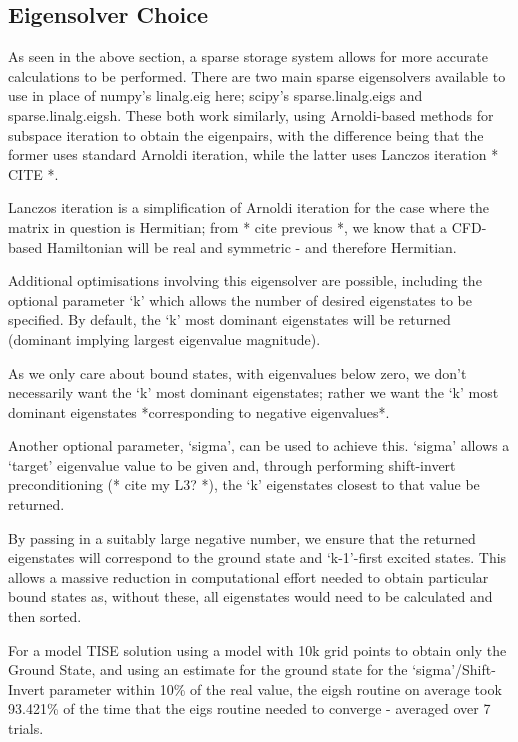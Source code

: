 \subsection{Eigensolver Choice}
As seen in the above section, a sparse storage system allows for more accurate calculations to be performed. There are two main sparse eigensolvers available to use in place of numpy's linalg.eig here; scipy's sparse.linalg.eigs and sparse.linalg.eigsh. These both work similarly, using Arnoldi-based methods for subspace iteration to obtain the eigenpairs, with the difference being that the former uses standard Arnoldi iteration, while the latter uses Lanczos iteration * CITE *. 

Lanczos iteration is a simplification of Arnoldi iteration for the case where the matrix in question is Hermitian; from * cite previous *, we know that a CFD-based Hamiltonian will be real and symmetric - and therefore Hermitian. 

Additional optimisations involving this eigensolver are possible, including the optional parameter `k' which allows the number of desired eigenstates to be specified. By default, the `k' most dominant eigenstates will be returned (dominant implying largest eigenvalue magnitude). 

As we only care about bound states, with eigenvalues below zero, we don't necessarily want the `k' most dominant eigenstates; rather we want the `k' most dominant eigenstates *corresponding to negative eigenvalues*. 

Another optional parameter, `sigma', can be used to achieve this. `sigma' allows a `target' eigenvalue value to be given and, through performing shift-invert preconditioning (* cite my L3? *), the `k' eigenstates closest to that value be returned. 

By passing in a suitably large negative number, we ensure that the returned eigenstates will correspond to the ground state and `k-1'-first excited states. This allows a massive reduction in computational effort needed to obtain particular bound states as, without these, all eigenstates would need to be calculated and then sorted. 

For a model TISE solution using a model with 10k grid points to obtain only the Ground State, and using an estimate for the ground state for the `sigma'/Shift-Invert parameter within 10\% of the real value, the eigsh routine on average took 93.421\% of the time that the eigs routine needed to converge - averaged over 7 trials. 

